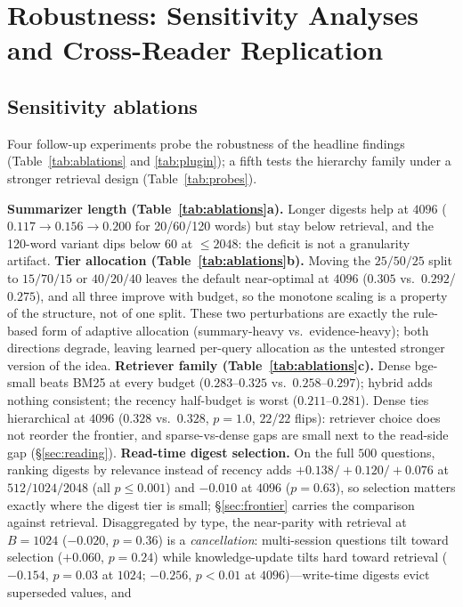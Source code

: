 \documentclass{article} %
\begin{document}
\section{Robustness: Sensitivity Analyses and Cross-Reader Replication}
\label{sec:robust}
\subsection{Sensitivity ablations}
\label{sec:ablation}
Four follow-up experiments probe the robustness of the headline findings
(Table~\ref{tab:ablations} and \ref{tab:plugin}); a fifth tests the hierarchy family under a
stronger retrieval design (Table~\ref{tab:probes}).

\textbf{Summarizer length (Table~\ref{tab:ablations}a).} Longer digests help at $4096$
($0.117 \rightarrow 0.156 \rightarrow 0.200$ for 20/60/120 words) but stay below retrieval,
and the 120-word variant dips below 60 at $\leq 2048$: the deficit is not a granularity
artifact. \textbf{Tier allocation (Table~\ref{tab:ablations}b).} Moving the $25/50/25$ split to
$15/70/15$ or $40/20/40$ leaves the default near-optimal at $4096$ ($0.305$ vs.\
$0.292$/$0.275$), and all three improve with budget, so the monotone scaling is a property of
the structure, not of one split. These two perturbations are exactly the rule-based form
of adaptive allocation (summary-heavy vs.\ evidence-heavy); both directions degrade,
leaving learned per-query allocation as the untested stronger version of the idea.
\textbf{Retriever family (Table~\ref{tab:ablations}c).} Dense bge-small beats BM25 at every
budget ($0.283$--$0.325$ vs.\ $0.258$--$0.297$); hybrid adds nothing consistent; the recency
half-budget is worst ($0.211$--$0.281$). Dense ties hierarchical at $4096$ ($0.328$ vs.\
$0.328$, $p{=}1.0$, $22$/$22$ flips): retriever choice does not reorder the frontier, and
sparse-vs-dense gaps are small next to the read-side gap (\S\ref{sec:reading}).
\textbf{Read-time digest selection.} On the full $500$ questions, ranking digests by relevance
instead of recency adds $+0.138/+0.120/+0.076$ at $512/1024/2048$ (all $p\leq0.001$) and
$-0.010$ at $4096$ ($p{=}0.63$), so selection matters exactly where the digest tier is small;
\S\ref{sec:frontier} carries the comparison against retrieval.
Disaggregated by type, the near-parity with retrieval at $B{=}1024$ ($-0.020$, $p{=}0.36$)
is a \emph{cancellation}: multi-session questions tilt toward selection ($+0.060$,
$p{=}0.24$) while knowledge-update tilts hard toward retrieval ($-0.154$, $p{=}0.03$ at
$1024$; $-0.256$, $p{<}0.01$ at $4096$)---write-time digests evict superseded values, and
\end{document}
